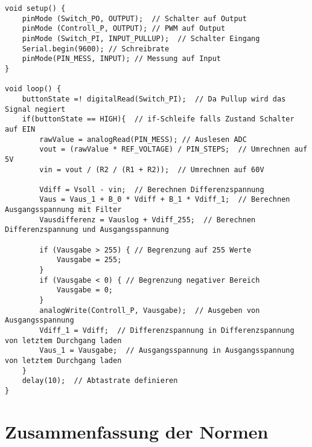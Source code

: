 \begin{appendix}
\begin{lstlisting}[basicstyle=\tiny,style=myArduino]
void setup() {
	pinMode (Switch_PO, OUTPUT);  // Schalter auf Output
	pinMode (Controll_P, OUTPUT); // PWM auf Output
	pinMode (Switch_PI, INPUT_PULLUP);  // Schalter Eingang
	Serial.begin(9600); // Schreibrate
	pinMode(PIN_MESS, INPUT); // Messung auf Input
}

void loop() {
	buttonState =! digitalRead(Switch_PI);  // Da Pullup wird das Signal negiert
	if(buttonState == HIGH){  // if-Schleife falls Zustand Schalter auf EIN
		rawValue = analogRead(PIN_MESS); // Auslesen ADC
		vout = (rawValue * REF_VOLTAGE) / PIN_STEPS;  // Umrechnen auf 5V
		vin = vout / (R2 / (R1 + R2));  // Umrechnen auf 60V
		
		Vdiff = Vsoll - vin;  // Berechnen Differenzspannung
		Vaus = Vaus_1 + B_0 * Vdiff + B_1 * Vdiff_1;  // Berechnen Ausgangsspannung mit Filter
		Vausdifferenz = Vauslog + Vdiff_255;  // Berechnen Differenzspannung und Ausgangsspannung
		
		if (Vausgabe > 255) { // Begrenzung auf 255 Werte
			Vausgabe = 255;
		}
		if (Vausgabe < 0) { // Begrenzung negativer Bereich
			Vausgabe = 0;
		}	
		analogWrite(Controll_P, Vausgabe);  // Ausgeben von Ausgangsspannung
		Vdiff_1 = Vdiff;  // Differenzspannung in Differenzspannung von letztem Durchgang laden
		Vaus_1 = Vausgabe;  // Ausgangsspannung in Ausgangsspannung von letztem Durchgang laden
	}
	delay(10);  // Abtastrate definieren
}
\end{lstlisting}

\newpage
\section{Zusammenfassung der Normen}\label{sec:Zusammenfassung_Normen}


\end{appendix}

